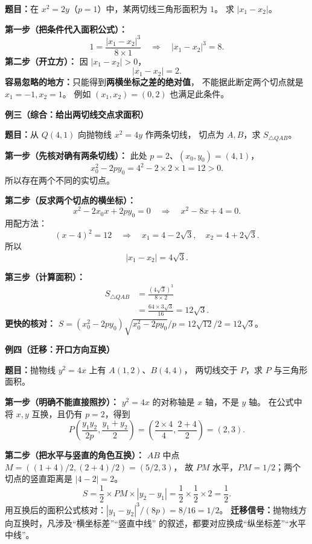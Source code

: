\begin{examplebox}
    \textbf{题目：}在 $x^2=2y$（$p=1$）中，某两切线三角形面积为 $1$。
    求 $|x_1-x_2|$。

    \textbf{第一步（把条件代入面积公式）：}
    \[
        1=\frac{|x_1-x_2|^3}{8\times1}
        \quad\Longrightarrow\quad |x_1-x_2|^3=8.
    \]
    \textbf{第二步（开立方）：} 因 $|x_1-x_2|>0$，
    \[
        \boxed{|x_1-x_2|=2}.
    \]
    \textbf{容易忽略的地方：}只能得到\textbf{两横坐标之差的绝对值}，
    不能据此断定两个切点就是 $x_1=-1,x_2=1$。
    例如 $(x_1,x_2)=(0,2)$ 也满足此条件。

    \medskip
    \textbf{\textcolor{CExample}{例三（综合：给出两切线交点求面积）}}

    \textbf{题目：}从 $Q(4,1)$ 向抛物线 $x^2=4y$ 作两条切线，
    切点为 $A,B$，求 $S_{\triangle QAB}$。

    \textbf{第一步（先核对确有两条切线）：}
    此处 $p=2$、$(x_0,y_0)=(4,1)$，
    \[
        x_0^2-2py_0=4^2-2\times2\times1=12>0.
    \]
    所以存在两个不同的实切点。

    \textbf{第二步（反求两个切点的横坐标）：}
    \[
        x^2-2x_0x+2py_0=0
        \quad\Longrightarrow\quad x^2-8x+4=0.
    \]
    用配方法：
    \[
        (x-4)^2=12
        \quad\Longrightarrow\quad
        x_1=4-2\sqrt3,\quad x_2=4+2\sqrt3.
    \]
    所以
    \[
        |x_1-x_2|=4\sqrt3.
    \]

    \textbf{第三步（计算面积）：}
    \[
    \begin{aligned}
        S_{\triangle QAB}
        &=\frac{(4\sqrt3)^3}{8\times2}\\
        &=\frac{64\times3\sqrt3}{16}
         =\boxed{12\sqrt3}.
    \end{aligned}
    \]
    \textbf{更快的核对：}
    $S=(x_0^2-2py_0)\sqrt{x_0^2-2py_0}/p
    =12\sqrt{12}/2=12\sqrt3$。

    \medskip
    \textbf{\textcolor{CExample}{例四（迁移：开口方向互换）}}

    \textbf{题目：}抛物线 $y^2=4x$ 上有 $A(1,2)$、$B(4,4)$，
    两切线交于 $P$，求 $P$ 与三角形面积。


    

    \textbf{第一步（明确不能直接照抄）：}
    $y^2=4x$ 的对称轴是 $x$ 轴，不是 $y$ 轴。
    在公式中将 $x,y$ 互换，且仍有 $p=2$，得到
    \[
        P\left(\frac{y_1y_2}{2p},\frac{y_1+y_2}{2}\right)
        =\left(\frac{2\times4}{4},\frac{2+4}{2}\right)=(2,3).
    \]

    \textbf{第二步（把水平与竖直的角色互换）：}
    $AB$ 中点 $M=((1+4)/2,(2+4)/2)=(5/2,3)$，
    故 $PM$ 水平，$PM=1/2$；两个切点的竖直距离是 $|4-2|=2$。
    \[
        S=\frac12\times PM\times|y_2-y_1|
        =\frac12\times\frac12\times2=\boxed{\frac12}.
    \]
    用互换后的面积公式核对：$|y_1-y_2|^3/(8p)=8/16=1/2$。
    \textbf{迁移信号：}抛物线方向互换时，凡涉及“横坐标差”“竖直中线”
    的叙述，都要对应换成“纵坐标差”“水平中线”。
\end{examplebox}
